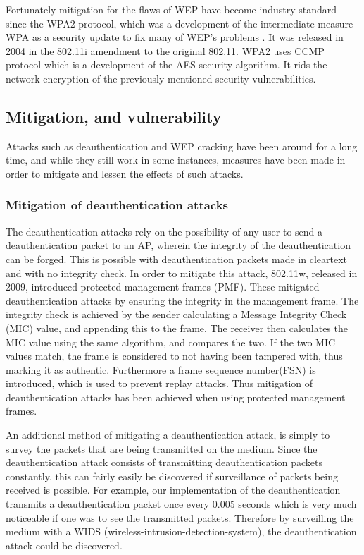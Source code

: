 Fortunately mitigation for the flaws of WEP have become industry standard since the WPA2 protocol, which was a development of the intermediate measure WPA as a security update to fix many of WEP's problems \cite{WPA2_1}\cite{WEP3}. It was released in 2004 in the 802.11i amendment to the original 802.11. WPA2 uses CCMP protocol which is a development of the AES security algorithm. It rids the network encryption of the previously mentioned security vulnerabilities. 


\subsection{Mitigation, and vulnerability}
Attacks such as deauthentication and WEP cracking have been around for a long time, and while they still work in some instances, measures have been made in order to mitigate and lessen the effects of such attacks.
\subsubsection{Mitigation of deauthentication attacks}
The deauthentication attacks rely on the possibility of any user to send a deauthentication packet to an AP, wherein the integrity of the deauthentication can be forged. This is possible with deauthentication packets made in cleartext and with no integrity check. In order to mitigate this attack, 802.11w, released in 2009, introduced protected management frames (PMF). These mitigated deauthentication attacks by ensuring the integrity in the management frame. The integrity check is achieved by the sender calculating a Message Integrity Check (MIC) value, and appending this to the frame. The receiver then calculates the MIC value using the same algorithm, and compares the two. If the two MIC values match, the frame is considered to not having been tampered with, thus marking it as authentic. Furthermore a frame sequence number(FSN) is introduced, which is used to prevent replay attacks. \cite{IEEE_802.11w}
Thus mitigation of deauthentication attacks has been achieved when using protected management frames. 

An additional method of mitigating a deauthentication attack, is simply to survey the packets that are being transmitted on the medium. Since the deauthentication attack consists of transmitting deauthentication packets constantly, this can fairly easily be discovered if surveillance of packets being received is possible. For example, our implementation of the deauthentication transmits a deauthentication packet once every 0.005 seconds which is very much noticeable if one was to see the transmitted packets. Therefore by surveilling the medium with a WIDS (wireless-intrusion-detection-system), the deauthentication attack could be discovered.

